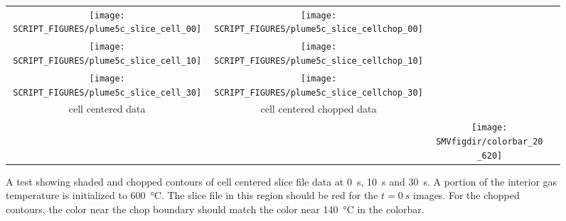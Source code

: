 \documentclass[11pt,twoside]{book}
\begin{document}
\begin{figure}[bph]
\begin{center}
\begin{tabular}{cccp{1.0in}}
 \texttt{[image: SCRIPT\_FIGURES/plume5c\_slice\_cell\_00]}&
 \texttt{[image: SCRIPT\_FIGURES/plume5c\_slice\_cellchop\_00]}\\

 \texttt{[image: SCRIPT\_FIGURES/plume5c\_slice\_cell\_10]}&
 \texttt{[image: SCRIPT\_FIGURES/plume5c\_slice\_cellchop\_10]}\\

 \texttt{[image: SCRIPT\_FIGURES/plume5c\_slice\_cell\_30]}&
 \texttt{[image: SCRIPT\_FIGURES/plume5c\_slice\_cellchop\_30]}\\

 cell centered data&cell centered chopped data\\
 &&\raisebox{0.5in}[0pt]{\texttt{[image: \\SMVfigdir/colorbar\_20\_620]}}\\
 \end{tabular}
\end{center}
 \caption[A test showing shaded and chopped contours of cell centered slice file
 data]{A test showing shaded and chopped contours of cell centered slice file data
 at \SI{0}{s}, \SI{10}{s} and \SI{30}{s}.  A portion of the interior gas temperature
 is initialized to \SI{600}{\degreeCelsius}.  The slice file in this region should
 be red for the $t=\SI{0}{s}$ images.  For the chopped contours, the color near the
 chop boundary should match the color near \SI{140}{\degreeCelsius} in the colorbar.}
\label{figcellaslicetest}%
\end{figure}
\end{document}
